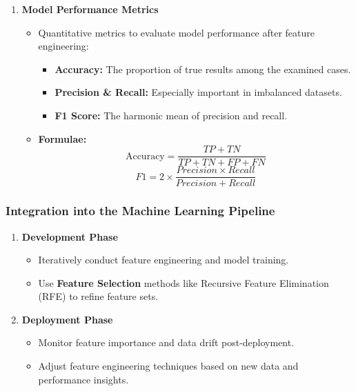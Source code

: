 \documentclass[aspectratio=169]{beamer}
\begin{document}
\begin{frame}[fragile]
\begin{enumerate}
        \item \textbf{Model Performance Metrics}
            \begin{itemize}
                \item Quantitative metrics to evaluate model performance after feature engineering:
                    \begin{itemize}
                        \item \textbf{Accuracy:} The proportion of true results among the examined cases.
                        \item \textbf{Precision \& Recall:} Especially important in imbalanced datasets.
                        \item \textbf{F1 Score:} The harmonic mean of precision and recall.
                    \end{itemize}
                \item \textbf{Formulae:}
                \begin{equation}
                    \text{Accuracy} = \frac{TP + TN}{TP + TN + FP + FN}
                \end{equation}
                \begin{equation}
                    F1 = 2 \times \frac{Precision \times Recall}{Precision + Recall}
                \end{equation}
            \end{itemize}
    \end{enumerate}
\end{frame}

\begin{frame}[fragile]
    \frametitle{Integration into the Machine Learning Pipeline}
    \begin{enumerate}
        \item \textbf{Development Phase}
            \begin{itemize}
                \item Iteratively conduct feature engineering and model training.
                \item Use \textbf{Feature Selection} methods like Recursive Feature Elimination (RFE) to refine feature sets.
            \end{itemize}

        \item \textbf{Deployment Phase}
            \begin{itemize}
                \item Monitor feature importance and data drift post-deployment.
                \item Adjust feature engineering techniques based on new data and performance insights.
            \end{itemize}
    \end{enumerate}
\end{frame}
\end{document}
